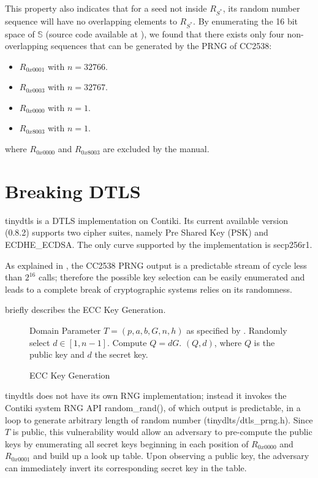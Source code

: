 This property also indicates that for a seed not inside $R_{S^*}$, its random number sequence will have no overlapping elements to $R_{S^*}$. By enumerating the 16 bit space of $\mathbb{S}$ (source code available at \cite{prngtest}), we found that there exists only four non-overlapping sequences that can be generated by the PRNG of CC2538:
\begin{itemize}
	\item $R_{0x0001}$ with $n = 32766$.
	\item $R_{0x0003}$ with $n = 32767$.
	\item $R_{0x0000}$ with $n = 1$.
	\item $R_{0x8003}$ with $n = 1$.
\end{itemize}
where $R_{0x0000}$ and $R_{0x8003}$ are excluded by the manual\cite{CC2538Manual}. 

\section{Breaking DTLS} \label{BreakDTLS}
tinydtls\cite{tinydtls} is a DTLS implementation on Contiki. Its current available version\cite{tinydtls082} (0.8.2) supports two cipher suites, namely Pre Shared Key (PSK) and ECDHE\_ECDSA\cite{rfc4492}. The only curve supported by the implementation is secp256r1\cite{secp256r1}.

As explained in , the CC2538 PRNG output is a predictable stream of cycle less than $2^{16}$ calls; therefore the possible key selection can be easily enumerated and leads to a complete break of cryptographic systems relies on its randomness.    

 briefly describes the ECC Key Generation.
\begin{figure}
	\begin{algorithmic}[1]
	\scriptsize
	\REQUIRE Domain Parameter $T = (p, a, b, G, n, h)$ as specified by \cite{secp256r1}.
	\STATE Randomly select $d \in [1, n-1]$.
	\STATE Compute $Q = dG$.
	\RETURN $(Q,d)$, where $Q$ is the public key and $d$ the secret key.
	\end{algorithmic}
	\caption{ECC Key Generation}
	\label{KeyGen}
\end{figure}

tinydtls does not have its own RNG implementation; instead it invokes the Contiki system RNG API random\_rand(), of which output is predictable, in a loop to generate arbitrary length of random number (tinydlts/dtls\_prng.h). Since $T$ is public, this vulnerability would allow an adversary to pre-compute the public keys by enumerating all secret keys beginning in each position of $R_{0x0000}$ and $R_{0x0001}$ and build up a look up table. Upon observing a public key, the adversary can immediately invert its corresponding secret key in the table.

